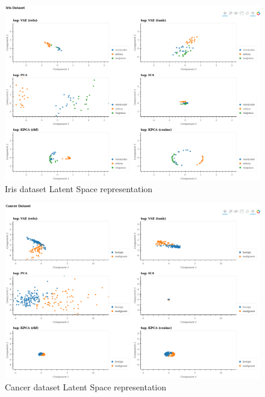 \documentclass[12pt]{article}
\begin{document}
\begin{figure}[!htb]
    \includegraphics[scale=0.3]{../../media/02-iris-latent.png}
    \caption{Iris dataset Latent Space representation}
    \label{fig:benchirislatent}
\end{figure}

\begin{figure}[!htb]
    \includegraphics[scale =0.3]{../../media/02-cancer-latent.png}
    \caption{Cancer dataset Latent Space representation}
    \label{fig:benchcancerlatent}
\end{figure}
\end{document}
